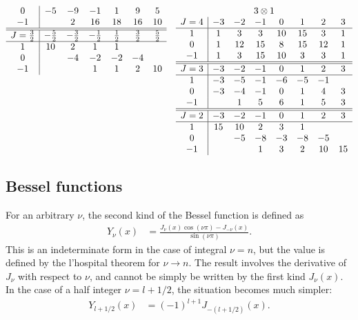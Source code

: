 \documentclass[amsmath,amssymb,prc,aps]{revtex4-2}
\begin{document}
\begin{gather}
\begin{array}[t]{c|ccccccc}
   0         & -5        & -9        & -1        &   1      &  9       &  5       \\
  -1         &           &  2        &  16       &  18      &  16      &  10
  \\\hline\hline
  J=\tfrac32 & -\tfrac52 & -\tfrac32 & -\tfrac12 & \tfrac12 & \tfrac32 & \tfrac52 \\ \hline
   1         &  10       &  2        &  1        &  1       &          &          \\
   0         &           &  -4       &  -2       & -2       & -4       &          \\
  -1         &           &           &  1        &  1       &  2       & 10
  \end{array}
  \quad
  \begin{array}[t]{c|ccccccc}
  \multicolumn{8}{c}{3\otimes1} \\
  J=4 & -3 & -2 & -1 &  0 &  1 &  2 & 3 \\ \hline
   1  &  1 &  3 &  3 & 10 & 15 &  3 & 1 \\
   0  &  1 & 12 & 15 &  8 & 15 & 12 & 1 \\
  -1  &  1 &  3 & 15 & 10 &  3 &  3 & 1
  \\\hline\hline
  J=3 & -3 & -2 & -1 &  0 &  1 &  2 & 3 \\ \hline
   1  & -3 & -5 & -1 & -6 & -5 & -1 &   \\
   0  & -3 & -4 & -1 &  0 &  1 &  4 & 3 \\
  -1  &    &  1 &  5 &  6 &  1 &  5 & 3  %
  \\\hline\hline
  J=2 & -3 & -2 & -1 &  0 &  1 &  2 & 3 \\ \hline
   1  & 15 & 10 &  2 &  3 &  1 &    &    \\
   0  &    & -5 & -8 & -3 & -8 & -5 &    \\
  -1  &    &    &  1 &  3 &  2 & 10 & 15
  \end{array}
\end{gather}

\subsection{Bessel functions}

For an arbitrary $\nu$, the second kind of the Bessel function is defined as
\begin{align}
  Y_\nu(x) &= \frac{J_\nu(x)\cos(\nu\pi) - J_{-\nu}(x)}{\sin(\nu\pi)}.
\end{align}
This is an indeterminate form in the case of integral $\nu = n$, but the value
is defined by the l'hospital theorem for $\nu\to n$.  The result involves the
derivative of $J_\nu$ with respect to $\nu$, and cannot be simply be written by
the first kind $J_\nu(x)$.  In the case of a half integer $\nu = l + 1/2$, the
situation becomes much simpler:
\begin{align}
  Y_{l+1/2}(x) &= (-1)^{l+1}J_{-(l+1/2)}(x).
\end{align}
\end{document}
